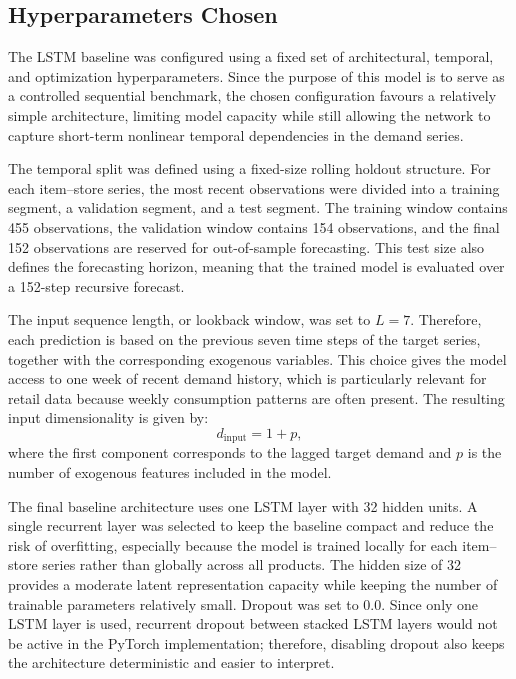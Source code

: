 \subsection{Hyperparameters Chosen}
\label{subsec:lstm_hyperparameters_chosen}

The LSTM baseline was configured using a fixed set of architectural, temporal, and optimization hyperparameters. Since the purpose of this model is to serve as a controlled sequential benchmark, the chosen configuration favours a relatively simple architecture, limiting model capacity while still allowing the network to capture short-term nonlinear temporal dependencies in the demand series.

The temporal split was defined using a fixed-size rolling holdout structure. For each item--store series, the most recent observations were divided into a training segment, a validation segment, and a test segment. The training window contains 455 observations, the validation window contains 154 observations, and the final 152 observations are reserved for out-of-sample forecasting. This test size also defines the forecasting horizon, meaning that the trained model is evaluated over a 152-step recursive forecast.

The input sequence length, or lookback window, was set to \(L=7\). Therefore, each prediction is based on the previous seven time steps of the target series, together with the corresponding exogenous variables. This choice gives the model access to one week of recent demand history, which is particularly relevant for retail data because weekly consumption patterns are often present. The resulting input dimensionality is given by:
\[
    d_{\text{input}} = 1 + p,
\]
where the first component corresponds to the lagged target demand and \(p\) is the number of exogenous features included in the model.

The final baseline architecture uses one LSTM layer with 32 hidden units. A single recurrent layer was selected to keep the baseline compact and reduce the risk of overfitting, especially because the model is trained locally for each item--store series rather than globally across all products. The hidden size of 32 provides a moderate latent representation capacity while keeping the number of trainable parameters relatively small. Dropout was set to 0.0. Since only one LSTM layer is used, recurrent dropout between stacked LSTM layers would not be active in the PyTorch implementation; therefore, disabling dropout also keeps the architecture deterministic and easier to interpret.


